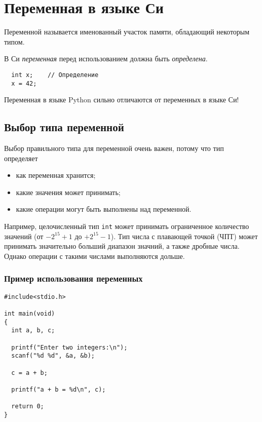 \section{Переменная в языке Си}

\begin{definition}
  Переменной называется именованный участок памяти, обладающий некоторым типом.
\end{definition}

В Си \textit{переменная} перед использованием должна быть \textit{определена}.
\begin{verbatim}
  int x;    // Определение
  x = 42;
\end{verbatim}

\begin{note}
  Переменная в языке Python сильно отличаются от переменных в языке Си!
\end{note}

\subsection{Выбор типа переменной}

Выбор правильного типа для переменной очень важен, потому что тип определяет
\begin{itemize}
  \item как переменная хранится;
  \item какие значения может принимать;
  \item какие операции могут быть выполнены над переменной.
\end{itemize}

Например, целочисленный тип \texttt{int} может принимать ограниченное количество значений (от $-2^{15}+1$ до $+2^{15}-1$). Тип числа с плавающей точкой (ЧПТ) может принимать значительно больший диапазон значний, а также дробные числа. Однако операции с такими числами выполняются дольше.

\subsubsection{Пример использования переменных}

\begin{verbatim}
#include<stdio.h>

int main(void)
{
  int a, b, c;

  printf("Enter two integers:\n");
  scanf("%d %d", &a, &b);

  c = a + b;

  printf("a + b = %d\n", c);

  return 0;
}
\end{verbatim}

